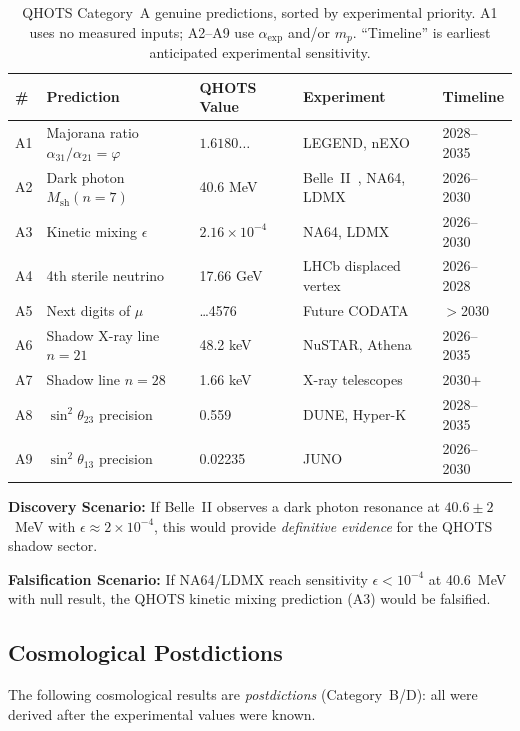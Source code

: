 \documentclass[aps,prd,twocolumn,superscriptaddress,floatfix,nofootinbib]{revtex4-2}
\theoremstyle{definition}
\theoremstyle{remark}
\newcommand{\vp}{\varphi}
\begin{document}
\begin{table}[ht]
\centering
\caption{%
  QHOTS Category~A genuine predictions, sorted by experimental priority.
  A1 uses no measured inputs; A2--A9 use $\alpha_\text{exp}$ and/or $m_p$.
  ``Timeline'' is earliest anticipated experimental sensitivity.
}
\label{tab:genuine_predictions}
\small
\begin{tabular}{lp{3.0cm}lll}
\toprule
\# & Prediction & QHOTS Value & Experiment & Timeline \\
\midrule
A1 & Majorana ratio $\alpha_{31}/\alpha_{21} = \vp$ &
  $1.6180\ldots$ &
  LEGEND, nEXO &
  2028--2035 \\
A2 & Dark photon $M_\text{sh}(n{=}7)$ &
  40.6 MeV &
  Belle~II~\cite{belleii}, NA64, LDMX &
  2026--2030 \\
A3 & Kinetic mixing $\epsilon$ &
  $2.16\times10^{-4}$ &
  NA64, LDMX &
  2026--2030 \\
A4 & 4th sterile neutrino &
  17.66 GeV &
  LHCb displaced vertex &
  2026--2028 \\
A5 & Next digits of $\mu$ &
  \ldots4576 &
  Future CODATA &
  $>$2030 \\
A6 & Shadow X-ray line $n{=}21$ &
  48.2 keV &
  NuSTAR, Athena &
  2026--2035 \\
A7 & Shadow line $n{=}28$ &
  1.66 keV &
  X-ray telescopes &
  2030+ \\
A8 & $\sin^2\theta_{23}$ precision &
  0.559 &
  DUNE, Hyper-K &
  2028--2035 \\
A9 & $\sin^2\theta_{13}$ precision &
  0.02235 &
  JUNO &
  2026--2030 \\
\bottomrule
\end{tabular}
\end{table}

\textbf{Discovery Scenario:} If Belle~II observes a dark photon resonance at $40.6\pm2$~MeV
with $\epsilon\approx2\times10^{-4}$, this would provide \textit{definitive evidence} for
the QHOTS shadow sector.

\textbf{Falsification Scenario:} If NA64/LDMX reach sensitivity $\epsilon < 10^{-4}$ at
40.6~MeV with null result, the QHOTS kinetic mixing prediction (A3) would be falsified.

\subsection{Cosmological Postdictions}

The following cosmological results are \textit{postdictions} (Category~B/D):
all were derived after the experimental values were known.
\end{document}

